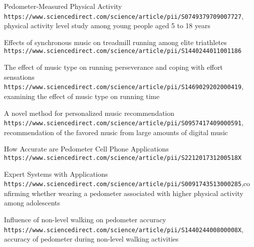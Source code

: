 \documentclass[10pt, a4paper]{article}
\begin{document}
\begin{thebibliography}{9}
Pedometer-Measured Physical Activity
\\\texttt{https://www.sciencedirect.com/science/article/pii/S0749379709007727}, physical activity level study among young people aged 5 to 18 years

Effects of synchronous music on treadmill running among elite triathletes
\\\texttt{https://www.sciencedirect.com/science/article/pii/S1440244011001186}

The effect of music type on running perseverance and coping with effort sensations 
\\\texttt{https://www.sciencedirect.com/science/article/pii/S1469029202000419}, examining the effect of music type on running time 

A novel method for personalized music recommendation
\\\texttt{https://www.sciencedirect.com/science/article/pii/S0957417409000591}, recommendation of the favored music from large amounts of digital music

How Accurate are Pedometer Cell Phone Applications 
\\\texttt{https://www.sciencedirect.com/science/article/pii/S221201731200518X}

Expert Systems with Applications 
\\\texttt{https://www.sciencedirect.com/science/article/pii/S0091743513000285},confirming whether wearing a pedometer associated with higher physical activity among adolescents

Influence of non-level walking on pedometer accuracy
\\\texttt{https://www.sciencedirect.com/science/article/pii/S144024400800008X}, accuracy of pedometer during non-level walking activities 


\end{thebibliography}

\printbibliography
\end{document}
